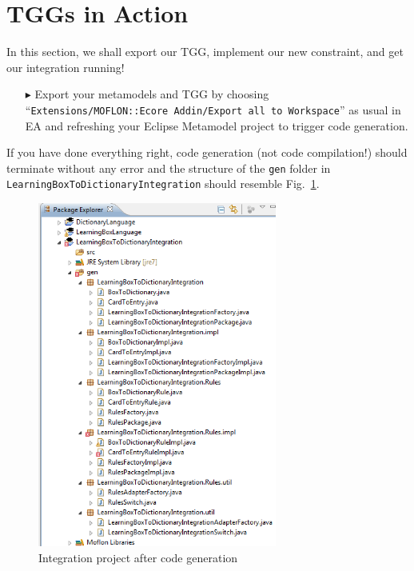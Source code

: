 \section{TGGs in Action}
\label{sect:TGGs_in_Action}
In this section, we shall export our TGG, implement our new constraint, and get our integration running!
 
\begin{enumerate}
\item[$\blacktriangleright$] Export your metamodels and TGG by choosing ``\texttt{Extensions/\-MOFLON::\-Ecore Addin\-/Export all to Workspace}'' as usual in EA and refreshing your Eclipse Metamodel project to trigger code generation.
\end{enumerate}

If you have done everything right, code generation (not code compilation!) should terminate without any error and the structure of the \texttt{gen} folder in \texttt{LearningBox\-To\-Dictionary\-Integration} should resemble Fig.~\ref{fig:gen_folder}.

\begin{figure}[htbp]
\begin{center}
  \includegraphics[width=0.7\textwidth]{pics/tggBilder/transformation/tgg22}
  \caption{Integration project after code generation}  
  \label{fig:gen_folder}
\end{center}
\end{figure} 

